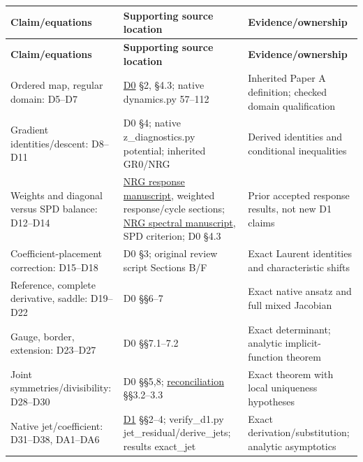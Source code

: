 \documentclass[11pt,a4paper]{article}
\begin{document}
\begingroup\small\setlength{\LTpre}{5pt}\setlength{\LTpost}{7pt}
\begin{longtable}{@{}>{\raggedright\arraybackslash}p{0.2500\dimexpr\textwidth-24pt\relax}>{\raggedright\arraybackslash}p{0.3700\dimexpr\textwidth-24pt\relax}>{\raggedright\arraybackslash}p{0.3800\dimexpr\textwidth-24pt\relax}@{}}
\toprule
\textbf{Claim/\allowbreak{}equations} & \textbf{Supporting source location} & \textbf{Evidence/\allowbreak{}ownership}\\ \midrule
\endfirsthead
\textbf{Claim/\allowbreak{}equations} & \textbf{Supporting source location} & \textbf{Evidence/\allowbreak{}ownership}\\ \midrule
\endhead
\bottomrule\endfoot
Ordered map, regular domain: D5--D7 & \href{\detokenize{supplement/historical/D0_chiral_reference_20261006/D0_CHIRAL_REFERENCE_AND_RECONCILIATION.md}}{D0} \S{}2, \S{}4.3; native dynamics.py 57--112 & Inherited Paper A definition; checked domain qualification\\[4pt]
Gradient identities/\allowbreak{}descent: D8--D11 & D0 \S{}4; native z\_\allowbreak{}diagnostics.py potential; inherited GR0/\allowbreak{}NRG & Derived identities and conditional inequalities\\[4pt]
Weights and diagonal versus SPD balance: D12--D14 & \href{\detokenize{supplement/historical/project/NATIVE_RESPONSE_GEOMETRY/manuscript/response.tex}}{NRG response manuscript}, weighted response/\allowbreak{}cycle sections; \href{\detokenize{supplement/historical/project/NATIVE_RESPONSE_GEOMETRY/manuscript/spectral.tex}}{NRG spectral manuscript}, SPD criterion; D0 \S{}4.3 & Prior accepted response results, not new D1 claims\\[4pt]
Coefficient-placement correction: D15--D18 & D0 \S{}3; original review script Sections B/\allowbreak{}F & Exact Laurent identities and characteristic shifts\\[4pt]
Reference, complete derivative, saddle: D19--D22 & D0 \S{}\S{}6--7 & Exact native ansatz and full mixed Jacobian\\[4pt]
Gauge, border, extension: D23--D27 & D0 \S{}\S{}7.1--7.2 & Exact determinant; analytic implicit-function theorem\\[4pt]
Joint symmetries/\allowbreak{}divisibility: D28--D30 & D0 \S{}\S{}5,8; \href{\detokenize{supplement/historical/FRESH_EYES_SCIENTIFIC_REVIEW_20261006/FRESH_EYES_RECONCILIATION_NOTE_v0.1.md}}{reconciliation} \S{}\S{}3.2--3.3 & Exact theorem with local uniqueness hypotheses\\[4pt]
Native jet/\allowbreak{}coefficient: D31--D38, DA1--DA6 & \href{\detokenize{supplement/historical/D1_chiral_drift_20261006/D1_NATIVE_CHIRAL_PHASE_DRIFT.md}}{D1} \S{}\S{}2--4; verify\_\allowbreak{}d1.py jet\_\allowbreak{}residual/\allowbreak{}derive\_\allowbreak{}jets; results exact\_\allowbreak{}jet & Exact derivation/\allowbreak{}substitution; analytic asymptotics\\[4pt]

\end{longtable}
\end{document}
